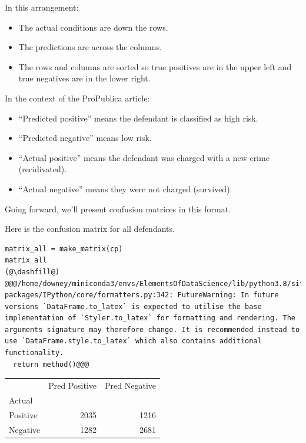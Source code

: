 In this arrangement:

\begin{itemize}
\item
  The actual conditions are down the rows.
\item
  The predictions are across the columns.
\item
  The rows and columns are sorted so true positives are in the upper
  left and true negatives are in the lower right.
\end{itemize}

In the context of the ProPublica article:

\begin{itemize}
\item
  ``Predicted positive'' means the defendant is classified as high risk.
\item
  ``Predicted negative'' means low risk.
\item
  ``Actual positive'' means the defendant was charged with a new crime
  (recidivated).
\item
  ``Actual negative'' means they were not charged (survived).
\end{itemize}

Going forward, we'll present confusion matrices in this format.

Here is the confusion matrix for all defendants.

\begin{lstlisting}[]
matrix_all = make_matrix(cp)
matrix_all
(@\dashfill@)
@@@/home/downey/miniconda3/envs/ElementsOfDataScience/lib/python3.8/site-packages/IPython/core/formatters.py:342: FutureWarning: In future versions `DataFrame.to_latex` is expected to utilise the base implementation of `Styler.to_latex` for formatting and rendering. The arguments signature may therefore change. It is recommended instead to use `DataFrame.style.to_latex` which also contains additional functionality.
  return method()@@@
\end{lstlisting}

\begin{tabular}{lrr}
\midrule
{} &  Pred Positive &  Pred Negative \\
Actual   &                &                \\
\midrule
Positive &           2035 &           1216 \\
Negative &           1282 &           2681 \\
\midrule
\end{tabular}

